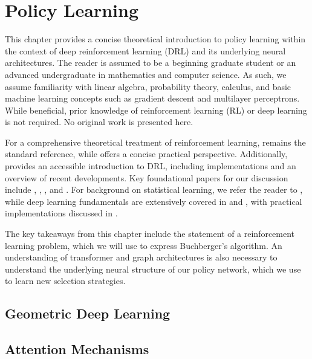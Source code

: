 \chapter{Policy Learning}

This chapter provides a concise theoretical introduction to policy learning within the context of deep reinforcement learning (DRL) and its underlying neural architectures. The reader is assumed to be a beginning graduate student or an advanced undergraduate in mathematics and computer science. As such, we assume familiarity with linear algebra, probability theory, calculus, and basic machine learning concepts such as gradient descent and multilayer perceptrons. While beneficial, prior knowledge of reinforcement learning (RL) or deep learning is not required. No original work is presented here.

For a comprehensive theoretical treatment of reinforcement learning, \cite{Sutton2018_introRL} remains the standard reference, while \cite{Winder2020_introRL} offers a concise practical perspective. Additionally, \cite{OpenAI2018_SpinningUp} provides an accessible introduction to DRL, including implementations and an overview of recent developments. Key foundational papers for our discussion include \cite{Mnih2013_DQN}, \cite{Schulman2017_PPO}, \cite{Lee2019_SetTransformer}, and \cite{Scarselli2009_GNNModel}. For background on statistical learning, we refer the reader to \cite{Hastie2009_ElementsOfStatisticalLearning}, while deep learning fundamentals are extensively covered in \cite{Goodfellow2016_DL} and \cite{Bishop2024_DL}, with practical implementations discussed in \cite{Geron2019_HandsOnML}.

The key takeaways from this chapter include the statement of a reinforcement learning problem, which we will use to express Buchberger's algorithm. An understanding of transformer and graph architectures is also necessary to understand the underlying neural structure of our policy network, which we use to learn new selection strategies.

\section{Geometric Deep Learning}



\section{Attention Mechanisms}



